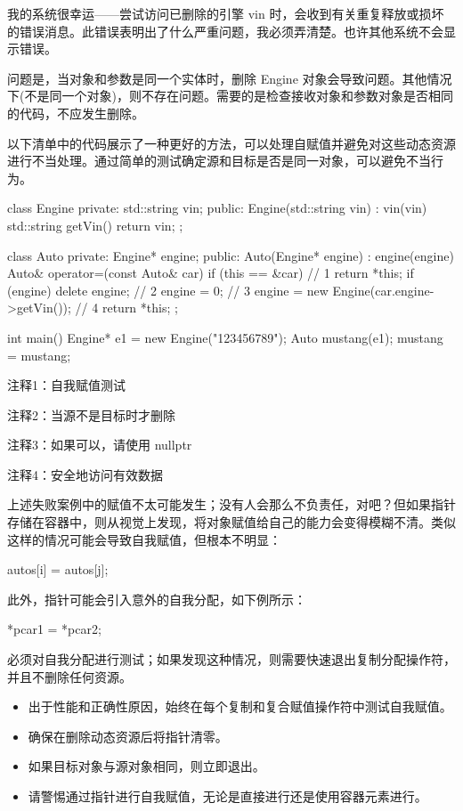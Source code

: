 我的系统很幸运——尝试访问已删除的引擎 vin 时，会收到有关重复释放或损坏的错误消息。此错误表明出了什么严重问题，我必须弄清楚。也许其他系统不会显示错误。


问题是，当对象和参数是同一个实体时，删除 Engine 对象会导致问题。其他情况下(不是同一个对象)，则不存在问题。需要的是检查接收对象和参数对象是否相同的代码，不应发生删除。

以下清单中的代码展示了一种更好的方法，可以处理自赋值并避免对这些动态资源进行不当处理。通过简单的测试确定源和目标是否是同一对象，可以避免不当行为。


\begin{cpp}
class Engine {
private:
  std::string vin;
public:
  Engine(std::string vin) : vin(vin) {}
  std::string getVin() { return vin; }
};

class Auto {
private:
  Engine* engine;
public:
  Auto(Engine* engine) : engine(engine) {}
  Auto& operator=(const Auto& car) {
    if (this == &car) // 1
      return *this;
    if (engine) {
      delete engine; // 2
      engine = 0; // 3
    }
    engine = new Engine(car.engine->getVin()); // 4
    return *this;
  }
};

int main() {
  Engine* e1 = new Engine("123456789");
  Auto mustang(e1);
  mustang = mustang;
}
\end{cpp}

{\footnotesize
注释1：自我赋值测试

注释2：当源不是目标时才删除

注释3：如果可以，请使用 nullptr

注释4：安全地访问有效数据
}

上述失败案例中的赋值不太可能发生；没有人会那么不负责任，对吧？但如果指针存储在容器中，则从视觉上发现，将对象赋值给自己的能力会变得模糊不清。类似这样的情况可能会导致自我赋值，但根本不明显：

\begin{cpp}
autos[i] = autos[j];
\end{cpp}

此外，指针可能会引入意外的自我分配，如下例所示：

\begin{cpp}
*pcar1 = *pcar2;
\end{cpp}

必须对自我分配进行测试；如果发现这种情况，则需要快速退出复制分配操作符，并且不删除任何资源。


\begin{itemize}
\item
出于性能和正确性原因，始终在每个复制和复合赋值操作符中测试自我赋值。

\item
确保在删除动态资源后将指针清零。

\item
如果目标对象与源对象相同，则立即退出。

\item
请警惕通过指针进行自我赋值，无论是直接进行还是使用容器元素进行。
\end{itemize}






